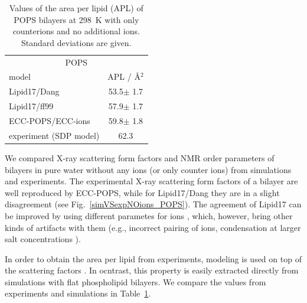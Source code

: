 \documentclass[journal=jpcbfk,manuscript=article]{achemso}
\begin{document}
\begin{table}[tb!] 
\centering
  \caption{Values of the area per lipid (APL) of POPS bilayers 
	   at 298~K with only  counterions and no additional ions. 
           Standard deviations are given. \label{tab:apls} } 
  \begin{tabular}{l|c } 
    \multicolumn{2}{c}{POPS} \\
    model          & APL / Å$^2$    \\ 
    \hline 
    Lipid17/Dang              & 53.5$\pm$ 1.7   \\ 
    Lipid17/ff99              & 57.9$\pm$ 1.7   \\ 
    \hline 
    ECC-POPS/ECC-ions         & 59.8$\pm$ 1.8   \\ 
    \hline 
    experiment (SDP model) \citep{kucerka14} & 62.3  \\ 
    \hline 
  \end{tabular} 
\end{table} 
 
We compared X-ray scattering form factors and NMR order parameters of bilayers
in pure water without any ions (or only counter ions)
from simulations and experiments. 
The experimental X-ray scattering form factors 
of a bilayer are well reproduced by ECC-POPS, 
while for Lipid17/Dang they are in a slight disagreement
(see Fig.~\ref{simVSexpNOions_POPS}). 
The agreement of Lipid17 can be improved by using different parametes for ions \cite{aqvist90},
which, however, bring other kinds of artifacts with them 
(e.g., incorrect pairing of ions, condensation at larger salt concentrations \cite{kohagen16, chen07, nmrlipids_proj4}). 

In order to obtain the area per lipid from experiments, modeling is used on top of the scattering factors \citep{kucerka14}. 
In ocntrast, this property is easily extracted directly from simulations with flat phospholipid bilayers. 
We compare the values from experiments and simulations in Table~\ref{tab:apls}. 
\end{document}
